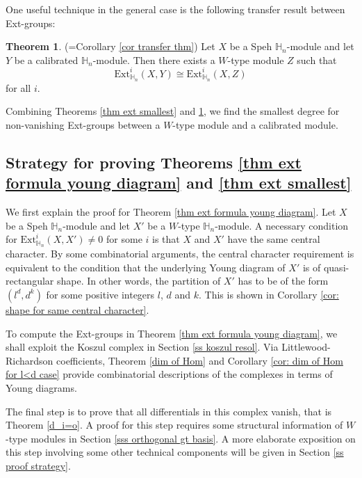 \documentclass[11pt]{amsart}
\numberwithin{equation}{section}
\theoremstyle{definition}
\newtheorem{theorem}[thm]{Theorem}
\begin{document}
One useful technique in the general case is the following transfer result between Ext-groups:

\begin{theorem} (=Corollary \ref{cor transfer thm}) \label{thm ext exchange}
Let $X$ be a Speh $\mathbb H_n$-module and let $Y$ be a calibrated $\mathbb H_n$-module. Then there exists a $W$-type module $Z$ such that 
\[  \mathrm{Ext}^i_{\mathbb H_n}(X, Y)\cong \mathrm{Ext}^i_{\mathbb H_n}(X, Z)
\]
for all $i$.
\end{theorem}

Combining Theorems \ref{thm ext smallest} and \ref{thm ext exchange}, we find the smallest degree for non-vanishing Ext-groups between a \(W\)-type module and a calibrated module.



\subsection{Strategy for proving Theorems \ref{thm ext formula young diagram} and \ref{thm ext smallest}}

We first explain the proof for Theorem \ref{thm ext formula young diagram}. Let \(X\) be a Speh \(\mathbb H_n\)-module and let \(X'\) be a \(W\)-type \(\mathbb H_n\)-module. A necessary condition for \(\mathrm{Ext}^i_{\mathbb H_n}(X,X')\neq 0 \) for some \(i\) is that \(X\) and \(X'\) have the same central character. By some combinatorial arguments, the central character requirement is equivalent to the condition that the underlying Young diagram of $X'$ is of quasi-rectangular shape.  In other words, the partition of $X'$ has to be of the form $(l^{d}, d^{k}) $ for  some positive integers $l$, $d$ and $k$. This is shown in  Corollary \ref{cor: shape for same central character}.

To compute the Ext-groups in Theorem \ref{thm ext formula young diagram}, we shall exploit the Koszul complex in Section \ref{ss koszul resol}. Via Littlewood-Richardson coefficients, Theorem \ref{dim of Hom} and Corollary \ref{cor: dim of Hom for l<d case}  provide combinatorial descriptions of the complexes in terms of Young diagrams. 

The final step is to prove that all differentials in this complex vanish, that is Theorem \ref{d_i=o}. A proof for this step requires some structural information of \(W\)-type modules in Section \ref{sss orthogonal gt basis}. A more elaborate exposition on this step involving some other technical components will be given in Section \ref{ss proof strategy}.
\end{document}
